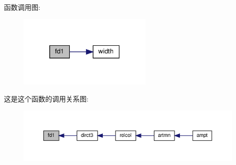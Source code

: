 函数调用图\+:
\nopagebreak
\begin{figure}[H]
\begin{center}
\leavevmode
\includegraphics[width=186pt]{fd1_8f90_a15e3c378fe5e283ca0c0802615dedc6d_cgraph}
\end{center}
\end{figure}
这是这个函数的调用关系图\+:
\nopagebreak
\begin{figure}[H]
\begin{center}
\leavevmode
\includegraphics[width=350pt]{fd1_8f90_a15e3c378fe5e283ca0c0802615dedc6d_icgraph}
\end{center}
\end{figure}
